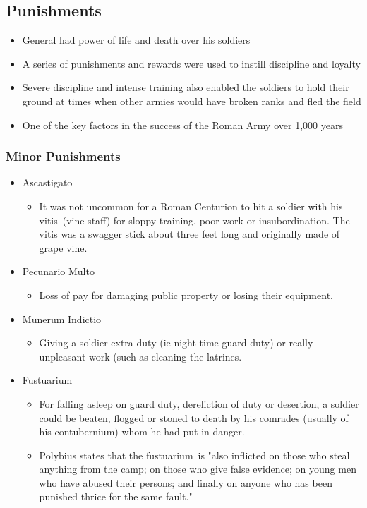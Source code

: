 \documentclass[12pt, twoside]{article}
\begin{document}
\subsection{Punishments}
\begin{itemize}
\item General had power of life and death over his soldiers
\item A series of punishments and rewards were used to instill discipline and loyalty
\item Severe discipline and intense training also enabled the soldiers to hold their ground at times when other armies would have broken ranks and fled the field
\item One of the key factors in the success of the Roman Army over 1,000 years
\end{itemize}

\subsubsection{Minor Punishments}
\begin{itemize}
\item Ascastigato
	\begin{itemize}
	\item It was not uncommon for a Roman Centurion to hit a soldier with his vitis (vine staff) for sloppy training, poor work or insubordination. The vitis was a swagger stick about three feet long and originally made of grape vine.
	\end{itemize} 
\item Pecunario Multo
	\begin{itemize}
	\item Loss of pay for damaging public property or losing their equipment.
	\end{itemize}
\item Munerum Indictio
	\begin{itemize}
	\item Giving a soldier extra duty (ie night time guard duty) or really unpleasant work (such as cleaning the latrines.
	\end{itemize}
\item Fustuarium
	\begin{itemize}
	\item For falling asleep on guard duty, dereliction of duty or desertion, a soldier could be beaten, flogged or stoned to death by his comrades (usually of his contubernium) whom he had put in danger.
	\item Polybius states that the fustuarium is "also inflicted on those who steal anything from the camp; on those who give false evidence; on young men who have abused their persons; and finally on anyone who has been punished thrice for the same fault."
	\end{itemize}
\end{itemize}
\end{document}
